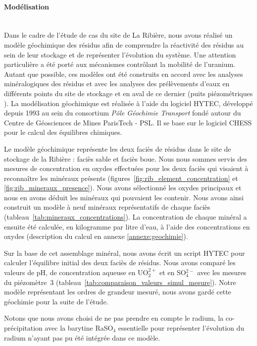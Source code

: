 \documentclass{article}
\begin{document}
\paragraph{Modélisation \\ \\}
Dans le cadre de l’étude de cas du site de La Ribière, nous avons réalisé un modèle géochimique des résidus afin de comprendre la réactivité des résidus au sein de leur stockage et de représenter l'évolution du système. Une attention particulière a été porté aux mécanismes contrôlant la mobilité de l'uranium. Autant que possible, ces modèles ont été construits en accord avec les analyses minéralogiques des résidus et avec les analyses des prélèvements d'eaux en différents points du site de stockage et en aval de ce dernier (puits piézométriques \cite{societe_areva_nc_etude_2010}). La modélisation géochimique est réalisée à l'aide du logiciel HYTEC, développé depuis 1993 au sein du consortium \emph{Pôle Géochimie Transport} fondé autour du Centre de Géosciences de Mines ParisTech - PSL. Il se base sur le logiciel CHESS \cite{lagneau:hal-00614306} pour le calcul des équilibres chimiques.

Le modèle géochimique représente les deux faciès de résidus dans le site de stockage de la Ribière : faciès sable et faciès boue.
Nous nous sommes servis des mesures de concentration en oxydes effectuées pour les deux faciès qui visaient à reconnaître les minéraux présents (figures~\ref{fig:rib_element_concentration} et \ref{fig:rib_mineraux_presence}). Nous avons sélectionné les oxydes principaux et nous en avons déduit les minéraux qui pouvaient les contenir. Nous avons ainsi construit un modèle à neuf minéraux représentatifs de chaque faciès (tableau~\ref{tab:mineraux_concentrations}). La concentration de chaque minéral a ensuite été calculée, en kilogramme par litre d’eau, à l’aide des concentrations en oxydes (description du calcul en annexe \ref{annexe:geochimie}).

Sur la base de cet assemblage minéral, nous avons écrit un script HYTEC pour calculer l’équilibre initial des deux faciès de résidus. Nous avons comparé les valeurs de pH, de concentration aqueuse en UO$_2^{2+}$ et en SO$_4^{2-}$ avec les mesures du piézomètre~3 (tableau~\ref{tab:comparaison_valeurs_simul_mesure}). Notre modèle représentant les ordres de grandeur mesuré, nous avons gardé cette géochimie pour la suite de l'étude. 

Notons que nous avons choisi de ne pas prendre en compte le radium, la co-précipitation avec la barytine RaSO$_4$ essentielle pour représenter l'évolution du radium n'ayant pas pu été intégrée dans ce modèle.
\end{document}
